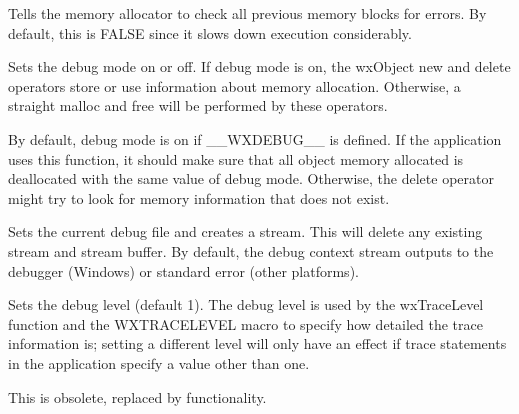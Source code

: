 \label{wxdebugcontextsetcheckprevious}


Tells the memory allocator to check all previous memory blocks for errors.
By default, this is FALSE since it slows down execution considerably.



\label{wxdebugcontextsetdebugmode}


Sets the debug mode on or off. If debug mode is on, the wxObject new and delete
operators store or use information about memory allocation. Otherwise,
a straight malloc and free will be performed by these operators.

By default, debug mode is on if \_\_WXDEBUG\_\_ is defined. If the application
uses this function, it should make sure that all object memory allocated
is deallocated with the same value of debug mode. Otherwise, the
delete operator might try to look for memory information that does not
exist.



\label{wxdebugcontextsetfile}


Sets the current debug file and creates a stream. This will delete any existing
stream and stream buffer. By default, the debug context stream
outputs to the debugger (Windows) or standard error (other platforms).

\label{wxdebugcontextsetlevel}


Sets the debug level (default 1). The debug level is used by the wxTraceLevel function and
the WXTRACELEVEL macro to specify how detailed the trace information is; setting
a different level will only have an effect if trace statements in the application
specify a value other than one.

This is obsolete, replaced by  functionality.

